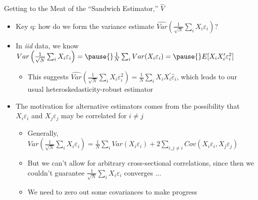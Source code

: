 \documentclass[11pt,english]{beamer}
\begin{document}
\begin{frame}{Getting to the Meat of the ``Sandwich Estimator,'' $\hat{V}$}

\begin{itemize}
\item Key q: how do we form the variance estimate $\widehat{Var}\left(\frac{1}{\sqrt{N}}\sum_i X_i\varepsilon_i\right)$?\bigskip\pause{}

\item In \emph{iid} data, we know $Var\left(\frac{1}{\sqrt{N}}\sum_i X_i\varepsilon_i\right)=\pause{}\frac{1}{N}\sum_i Var(X_i\varepsilon_i)=\pause{}E[X_iX_i^\prime\varepsilon_i^2]$\smallskip
\begin{itemize}\pause{}
\item This suggests $\widehat{Var}\left(\frac{1}{\sqrt{N}}\sum_i X_i\varepsilon_i^2\right)=\frac{1}{N}\sum_iX_iX_i^\prime\hat\varepsilon_i$, which leads to our usual heteroskedasticity-robust estimator
\end{itemize}\bigskip\pause{}

\item The motivation for alternative estimators comes from the possibility that $X_i\varepsilon_i$ and $X_j\varepsilon_j$ may be correlated for $i\neq j$\smallskip
\begin{itemize}
\item Generally,  $Var\left(\frac{1}{\sqrt{N}}\sum_i X_i\varepsilon_i\right)=\frac{1}{N}\sum _i Var(X_i\varepsilon_i)+2\sum_{i,j\neq i}Cov(X_i\varepsilon_i,X_j\varepsilon_j)$\smallskip\pause{}
\item But we can't allow for arbitrary cross-sectional correlations, since then we couldn't guarantee $\frac{1}{\sqrt{N}}\sum_i X_i\varepsilon_i$ converges ... \smallskip\pause{}
\item We need to zero out some covariances to make progress
\end{itemize}
\end{itemize}
\end{frame}
\end{document}
